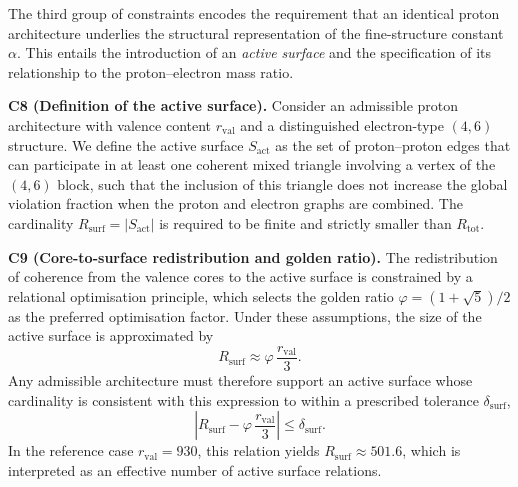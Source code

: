 \documentclass[11pt,a4paper]{article}
\begin{document}
The third group of constraints encodes the requirement that an identical proton architecture underlies the structural representation of the fine-structure constant $\alpha$. This entails the introduction of an \emph{active surface} and the specification of its relationship to the proton–electron mass ratio.

\medskip
\noindent\textbf{C8 (Definition of the active surface).} Consider an admissible proton architecture with valence content $r_{\mathrm{val}}$ and a distinguished electron-type $(4,6)$ structure. We define the active surface $S_{\mathrm{act}}$ as the set of proton–proton edges that can participate in at least one coherent mixed triangle involving a vertex of the $(4,6)$ block, such that the inclusion of this triangle does not increase the global violation fraction when the proton and electron graphs are combined.\cite{LaubscherDerivationAlpha2026} The cardinality $R_{\mathrm{surf}}=|S_{\mathrm{act}}|$ is required to be finite and strictly smaller than $R_{\mathrm{tot}}$.

\medskip
\noindent\textbf{C9 (Core-to-surface redistribution and golden ratio).} The redistribution of coherence from the valence cores to the active surface is constrained by a relational optimisation principle, which selects the golden ratio $\varphi=(1+\sqrt{5})/2$ as the preferred optimisation factor.\cite{LaubscherGoldenRatioPDL2026} Under these assumptions, the size of the active surface is approximated by
\begin{equation}
R_{\mathrm{surf}} \approx \varphi\,\frac{r_{\mathrm{val}}}{3}.
\end{equation}
Any admissible architecture must therefore support an active surface whose cardinality is consistent with this expression to within a prescribed tolerance $\delta_{\mathrm{surf}}$,
\begin{equation}
\left|R_{\mathrm{surf}} - \varphi\,\frac{r_{\mathrm{val}}}{3}\right| \leq \delta_{\mathrm{surf}}.
\end{equation}
In the reference case $r_{\mathrm{val}}=930$, this relation yields $R_{\mathrm{surf}}\approx 501.6$, which is interpreted as an effective number of active surface relations.\cite{LaubscherDerivationAlpha2026}
\end{document}
